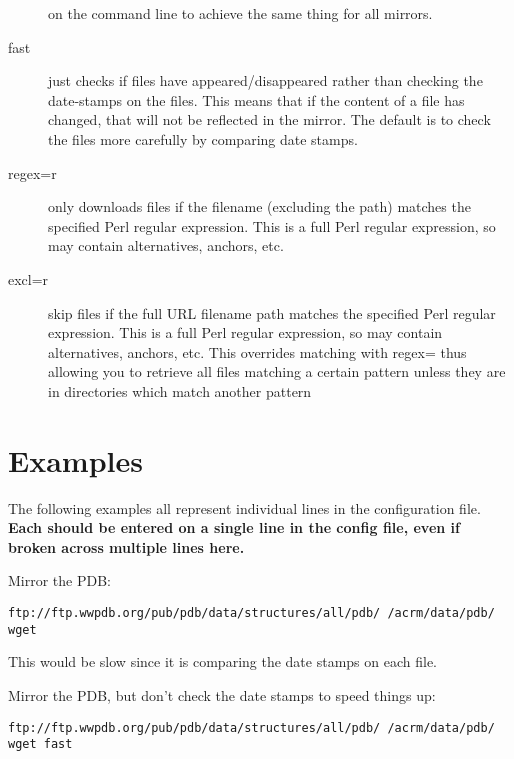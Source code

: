\documentclass{article}
\begin{document}
\begin{description}
                   on the command line to achieve the same thing for
                   all mirrors.
\item[fast] just checks if files have appeared/disappeared rather than
                  checking the date-stamps on the files. This means
                  that if the content of a file has changed, that will
                  not be reflected in the mirror. The default is to
                  check the files more carefully by comparing date
                  stamps.
\item[regex=r]    only downloads files if the filename (excluding
                  the path) matches the specified Perl regular
                  expression. This is a full Perl regular expression,
                  so may contain alternatives, anchors, etc.
\item[excl=r]     skip files if the full URL filename path matches the
                  specified Perl regular expression. This is a full
                  Perl regular expression, so may contain
                  alternatives, anchors, etc. This overrides matching
                  with regex= thus allowing you to retrieve all files
                  matching a certain pattern unless they are in 
                  directories which match another pattern
                  
\end{description}

\section{Examples}
The following examples all represent individual lines in the
 configuration file. {\bfseries Each should be entered on a single
 line in the config file, even if broken across multiple lines here.}
\vspace{1em}

\noindent Mirror the PDB:
{\footnotesize
\begin{verbatim}
ftp://ftp.wwpdb.org/pub/pdb/data/structures/all/pdb/ /acrm/data/pdb/ wget
\end{verbatim}
}
This would be slow since it is comparing the date stamps on each
file.
\vspace{1em}

\noindent Mirror the PDB, but don't check the date stamps to speed things up:
{\footnotesize
\begin{verbatim}
ftp://ftp.wwpdb.org/pub/pdb/data/structures/all/pdb/ /acrm/data/pdb/ wget fast
\end{verbatim}
}
\vspace{1em}
\end{document}
